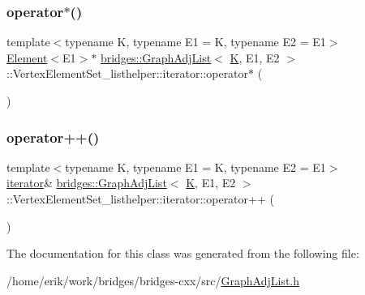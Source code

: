 \subsubsection{\texorpdfstring{operator$\ast$()}{operator*()}}
{\footnotesize\ttfamily template$<$typename K, typename E1 = K, typename E2 = E1$>$ \\
\hyperlink{classbridges_1_1_element}{Element}$<$E1$>$$\ast$ \hyperlink{classbridges_1_1_graph_adj_list}{bridges\+::\+Graph\+Adj\+List}$<$ \hyperlink{namespacebridges_acfb0a4f7877d8f63de3e6862004c50edaa5f3c6a11b03839d46af9fb43c97c188}{K}, E1, E2 $>$\+::Vertex\+Element\+Set\+\_\+listhelper\+::iterator\+::operator$\ast$ (\begin{DoxyParamCaption}{ }\end{DoxyParamCaption})\hspace{0.3cm}{\ttfamily [inline]}}

\mbox{\label{classbridges_1_1_graph_adj_list_1_1_vertex_element_set__listhelper_1_1iterator_ad0d28c10ae2a8a5592ccda4b659fd638}} 
\subsubsection{\texorpdfstring{operator++()}{operator++()}}
{\footnotesize\ttfamily template$<$typename K, typename E1 = K, typename E2 = E1$>$ \\
\hyperlink{classbridges_1_1_graph_adj_list_1_1_vertex_element_set__listhelper_1_1iterator}{iterator}\& \hyperlink{classbridges_1_1_graph_adj_list}{bridges\+::\+Graph\+Adj\+List}$<$ \hyperlink{namespacebridges_acfb0a4f7877d8f63de3e6862004c50edaa5f3c6a11b03839d46af9fb43c97c188}{K}, E1, E2 $>$\+::Vertex\+Element\+Set\+\_\+listhelper\+::iterator\+::operator++ (\begin{DoxyParamCaption}{ }\end{DoxyParamCaption})\hspace{0.3cm}{\ttfamily [inline]}}



The documentation for this class was generated from the following file\+:\begin{DoxyCompactItemize}
\item 
/home/erik/work/bridges/bridges-\/cxx/src/\hyperlink{_graph_adj_list_8h}{Graph\+Adj\+List.\+h}\end{DoxyCompactItemize}
